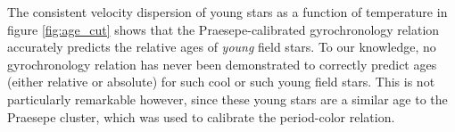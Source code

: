 The consistent velocity dispersion of young stars as a function of temperature
in figure \ref{fig:age_cut} shows that the Praesepe-calibrated gyrochronology
relation accurately predicts the relative ages of {\it young} field stars.
To our knowledge, no gyrochronology relation has never been demonstrated to
correctly predict ages (either relative or absolute) for such cool or such
young field stars.
This is not particularly remarkable however, since these young stars are a
similar age to the Praesepe cluster, which was used to calibrate the
period-color relation.


